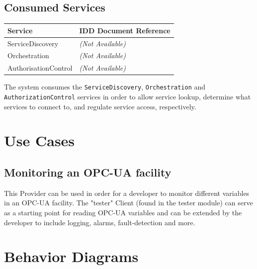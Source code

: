 \documentclass[a4paper]{arrowhead}
\begin{document}
\subsection{Consumed Services}
\noindent\begin{tabularx}{\textwidth}{| p{5.8cm} | X |} \hline
\rowcolor{gray!33} Service & IDD Document Reference \\ \hline

ServiceDiscovery           & {\small\textit{(Not Available)}} \\ \hline
Orchestration              & {\small\textit{(Not Available)}} \\ \hline
AuthorisationControl       & {\small\textit{(Not Available)}} \\ \hline

\end{tabularx}
\vspace*{\baselineskip}

The system consumes the \texttt{ServiceDiscovery}, \texttt{Orchestration} and \texttt{AuthorizationControl} services in order to allow service lookup, determine what services to connect to, and regulate service access, respectively.

\newpage

\section{Use Cases}
\label{sec:use-cases}
\subsection{Monitoring an OPC-UA facility}
This Provider can be used in order for a developer to monitor different variables in an OPC-UA facility. The "tester" Client (found in the tester module) can serve as a starting point for reading OPC-UA variables and can be extended by the developer to include logging, alarms, fault-detection and more.


\section{Behavior Diagrams}
\label{sec:behavior}
\end{document}
